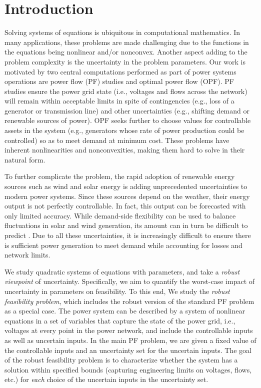\section{Introduction} \label{sec:intro}  

Solving systems of equations is ubiquitous in computational mathematics.
In many applications, these problems are made challenging due to the functions in the equations being nonlinear and/or nonconvex.
Another aspect adding to the problem complexity is the uncertainty in the problem parameters.
Our work is motivated by two central computations performed as part of power systems operations are power flow (PF) studies and optimal power flow (OPF).
PF studies ensure the power grid state (i.e., voltages and flows across the network) will remain within acceptable limits in spite of contingencies (e.g., loss of a generator or transmission line) and other uncertainties (e.g., shifting demand or renewable sources of power).
OPF seeks further to choose values for controllable assets in the system (e.g., generators whose rate of power production could be controlled) so as to meet demand at minimum cost.
These problems have inherent nonlinearities and nonconvexities, making them hard to solve in their natural form.
  
To further complicate the problem, the rapid adoption of renewable energy sources such as wind and solar energy is adding unprecedented uncertainties to modern power systems.
Since these sources depend on the weather, their energy output is not perfectly controllable.
In fact, this output can be forecasted with only limited accuracy.
While demand-side flexibility can be used to balance fluctuations in solar and wind generation, its amount can in turn be difficult to predict \cite{mathieu2011examining,taylor2015uncertainty}.
Due to all these uncertainties, it is increasingly difficult to ensure there is sufficient power generation to meet demand while accounting for losses and network limits.

\medskip
We study quadratic systems of equations with parameters, and take a \emph{robust viewpoint} of uncertainty.
Specifically, we aim to quantify the worst-case impact of uncertainty in parameters on feasibility.
To this end, We study the \emph{robust feasibility problem}, which includes the robust version of the standard PF problem as a special case.
The power system can be described by a system of nonlinear equations in a set of variables that capture the state of the power grid, i.e., voltages at every point in the power network, and include the controllable inputs as well as uncertain inputs.
In the main PF problem, we are given a fixed value of the controllable inputs and an uncertainty set for the uncertain inputs.
The goal of the robust feasibility problem is to characterize whether the system has a solution within specified bounds (capturing engineering limits on voltages, flows, etc.) for {\em each} choice of the uncertain inputs in the uncertainty set.

